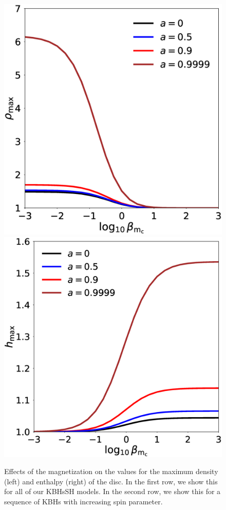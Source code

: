 \documentclass[twocolumn,aps,showpacs,showkeys,prd,superscriptaddress,byrevtex, amsmath]{revtex4-1}
\begin{document}
\begin{figure}
\hspace{-0.cm}
\\
\includegraphics[scale=0.2]{figures/fig7_Kerr_dens.eps}
\hspace{-0.cm}
\includegraphics[scale=0.2]{figures/fig7_Kerr_enth.eps}
\hspace{-0.cm}
\caption{Effects of the magnetization on the values for the maximum density (left) and enthalpy (right) of the disc. In the first row, we show this for all of our KBHsSH models. In the second row, we show this for a sequence of KBHs with increasing spin parameter.}
\label{comparison_HBH_Kerr_dens_enth}
\end{figure}
\end{document}

